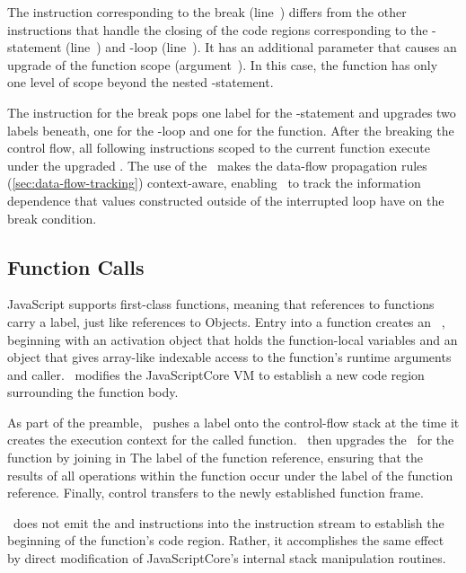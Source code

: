 The \popj instruction corresponding to the break (line~) differs from the other \popj instructions that handle the closing of the code regions corresponding to the -statement (line~) and -loop (line~).
It has an additional parameter that causes an upgrade of the function scope (argument~).
In this case, the function has only one level of scope beyond the nested -statement.

The \popj instruction for the break pops one label for the -statement and upgrades two labels beneath, one for the -loop and one for the function.
After the breaking the control flow, all following instructions scoped to the current function execute under the upgraded \pclabel.
The use of the \pclabel\ makes the data-flow propagation rules (\autoref{sec:data-flow-tracking}) context-aware, enabling \FlowCore\ to track the information dependence that values constructed outside of the interrupted loop have on the break condition.

\subsection{Function Calls}
\label{sec:function-calls}

JavaScript supports first-class functions, meaning that references to functions carry a label, just like references to Objects.
Entry into a function creates an ~\cite{ecma}, beginning with an activation object that holds the function-local variables and an  object that gives array-like indexable access to the function's runtime arguments and caller.
\FlowCore\ modifies the JavaScriptCore VM to establish a new code region surrounding the function body.

As part of the preamble, \FlowCore\ pushes a label onto the control-flow stack at the time it creates the execution context for the called function.
\FlowCore\ then upgrades the \pclabel\ for the function by joining in The label of the function reference, ensuring that the results of all operations within the function occur under the label of the function reference.
Finally, control transfers to the newly established function frame.

\FlowCore\ does not emit the \dup and \join instructions into the instruction stream to establish the beginning of the function's code region.
Rather, it accomplishes the same effect by direct modification of JavaScriptCore's internal stack manipulation routines.

